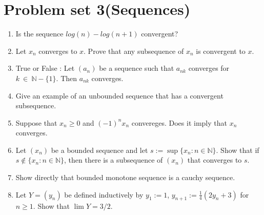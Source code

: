 \documentclass[12pt]{article}
\begin{document}
\newpage

\section{Problem set 3(Sequences)}
    \begin{enumerate}
        \item Is the sequence $ log (n) - log(n+1) $ convergent?
        \item Let $x_n $ converges to $x$. Prove that any subsequence of $x_n $ is convergent to $x$.
        \item True or False :
        Let $(a_n)$ be a sequence such that $a_{nk}$ converges for $k~\in~ \mathbb N - \{1\}$. Then $a_{nk}$ converges. 
        \item Give an example of an unbounded sequence that has a convergent subsequence.
        \item Suppose that $x_n\geq0$ and $(-1)^nx_n$ convereges. Does it imply that $x_n$ converges.
        \item Let $(x_n)$ be a bounded sequence and let $s := \sup\{x_n : n \in \mathbb{N}\}$. Show that if $s \notin \{x_n : n \in \mathbb{N}\}$, then there is a subsequence of $(x_n)$ that converges to $s$.
        \item Show directly that bounded monotone sequence is a cauchy sequence.
        \item Let $Y = (y_n)$ be defined inductively by $y_1 := 1$, $y_{n+1} := \frac{1}{4}(2y_n+3)$ for $n \ge 1$. Show that $\lim Y = 3/2$.
    \end{enumerate}
\end{document}
